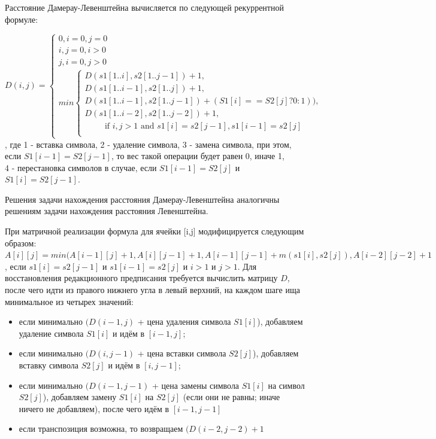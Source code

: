 \documentclass[a4paper,12pt]{report}
\begin{document}
Расстояние Дамерау-Левенштейна вычисляется по следующей рекуррентной формуле:

\begin{displaymath}
D(i,j) = \left\{ \begin{array}{ll}
 0,  \textrm{$i = 0, j = 0$}\\
 i,  \textrm{$j = 0, i > 0$}\\
 j,  \textrm{$i = 0, j > 0$}\\
min\left\{ \begin{array}{ll}
D(s1[1..i],s2[1..j-1]) + 1,\\
D(s1[1..i-1],s2[1..j]) + 1,\\
D(s1[1..i-1],s2[1..j-1]) + (S1[i] == S2[j] ? 0 : 1)),\\
D(s1[1..i-2],s2[1..j-2]) + 1, \\ \hspace{1cm}\textrm{if $i,j>1$ and $s1[i] = s2[j-1],s1[i-1]=s2[j] $}\\
\end{array} \right.
  \end{array} \right.
\end{displaymath}
, где 1 - вставка символа, 2 - удаление символа, 3 - замена символа, при этом, если $S1[i - 1] = S2[j - 1]$, то вес такой операции будет равен 0, иначе 1,\\ 4 - перестановка символов в  случае, если $S1[i-1] = S2[j]$ и $S1[i] = S2[j-1]$.

Решения задачи нахождения расстояния Дамерау-Левенштейна аналогичны решениям задачи нахождения расстояния Левенштейна. 

При матричной реализации формула для ячейки [i,j] модифицируется следующим образом: $A[i][j] = min (A[i-1][j] + 1, A[i][j-1] + 1, A[i-1][j-1] + m(s1[i], s2[j]), A[i - 2][j - 2] + 1$, если $s1[i] = s2[j-1]$ и $ s1[i-1] = s2[j]$ и $i > 1$ и $j > 1$. Для восстановления редакционного предписания требуется вычислить матрицу $D$, после чего идти из правого нижнего угла в левый верхний, на каждом шаге ища минимальное из четырех значений:
\begin{itemize}
    \item если минимально $(D(i-1, j)$ + цена удаления символа $S1[i]$), добавляем удаление символа $S1[i]$ и идём в $[i-1, j]$;
    \item если минимально $(D(i, j-1)$ + цена вставки символа $S2[j]$), добавляем вставку     символа $S2[j]$ и идём в $[i, j-1]$;
    \item если минимально $(D(i-1, j-1)$ + цена замены символа $S1[i]$ на символ $S2[j]$),     добавляем замену $S1[i]$ на $S2[j]$ (если они не равны; иначе ничего не добавляем), после чего идём в $[i-1, j-1]$
    \item если транспозиция возможна, то возвращаем $(D(i-2, j-2) + 1$
\end{itemize}
\end{document}

